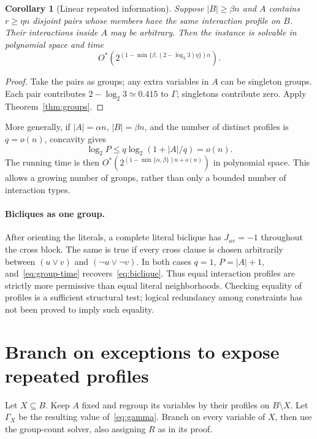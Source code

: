 \documentclass[11pt,a4paper]{article}
\newtheorem{corollary}[theorem]{Corollary}
\theoremstyle{definition}
\newcommand{\Ostar}{O^{*}}
\begin{document}
\begin{corollary}[Linear repeated information]\label{cor:pairs}
Suppose $|B|\ge\beta n$ and $A$ contains $r\ge\eta n$ disjoint pairs
whose members have the same interaction profile on $B$. Their interactions
inside $A$ may be arbitrary. Then the instance is solvable in polynomial
space and time
\[
 \Ostar\!\left(2^{(1-\min\{\beta,(2-\log_2 3)\eta\})n}\right).
\]
\end{corollary}
\begin{proof}
Take the pairs as groups; any extra variables in $A$ can be singleton
groups. Each pair contributes $2-\log_2 3\simeq0.415$ to $\Gamma$;
singletons contribute zero. Apply Theorem~\ref{thm:groups}.
\end{proof}

More generally, if $|A|=\alpha n$, $|B|=\beta n$, and the number of
distinct profiles is $q=o(n)$, concavity gives
\[
 \log_2 P\le q\log_2(1+|A|/q)=o(n).
\]
The running time is then
$\Ostar(2^{(1-\min\{\alpha,\beta\})n+o(n)})$ in polynomial space.
This allows a growing number of groups, rather than only a bounded number
of interaction types.

\paragraph{Bicliques as one group.}
After orienting the literals, a complete literal biclique has
$J_{uv}=-1$ throughout the cross block. The same is true if every cross
clause is chosen arbitrarily between $(u\lor v)$ and
$(\neg u\lor\neg v)$. In both cases $q=1$,
$P=|A|+1$, and~\eqref{eq:group-time} recovers~\eqref{eq:biclique}.
Thus equal interaction profiles are strictly more permissive than equal
literal neighborhoods. Checking equality of profiles is a sufficient
structural test; logical redundancy among constraints has not been proved
to imply such equality.

\section{Branch on exceptions to expose repeated profiles}\label{sec:exceptions}

Let $X\subseteq B$. Keep $A$ fixed and regroup its variables by their
profiles on $B\setminus X$. Let $\Gamma_X$ be the resulting value
of~\eqref{eq:gamma}. Branch on every variable of $X$, then use the
group-count solver, also assigning $R$ as in its proof.
\end{document}
